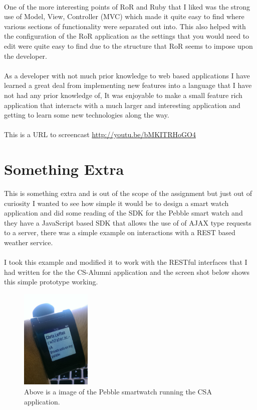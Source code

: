 \documentclass{article}
\begin{document}
\\
One of the more interesting points of RoR and Ruby that I liked was the strong use of Model, View, Controller (MVC) which made it quite easy to find where various sections of functionality were separated out into. This also helped with the configuration of the RoR application as the settings that you would need to edit were quite easy to find due to the structure that RoR seems to impose upon the developer.\\
\\
As a developer with not much prior knowledge to web based applications I have learned a great deal from implementing new features into a language that I have not had any prior knowledge of, It was enjoyable to make a small feature rich application that interacts with a much larger and interesting application and getting to learn some new technologies along the way.\\
\\
This is a URL to screencast \url{http://youtu.be/bMKITRHoGO4}

\newpage
\section{Something Extra}

This is something extra and is out of the scope of the assignment but just out of curiosity I wanted to see how simple it would be to design a smart watch application and did some reading of the SDK for the Pebble smart watch and they have a JavaScript based SDK that allows the use of of AJAX type requests to a server, there was a simple example on interactions with a REST based weather service.\\
\\
I took this example and modified it to work with the RESTful interfaces that I had written for the the CS-Alumni application and the screen shot below shows this simple prototype working.

\begin{figure}[H]
\centering
\includegraphics[width=0.3\textwidth]{pebble}
\caption{Above is a image of the Pebble smartwatch running the CSA application.}
\end{figure}
\end{document}
